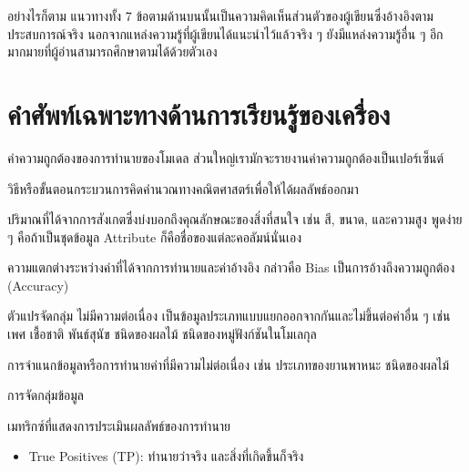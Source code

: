 อย่างไรก็ตาม แนวทางทั้ง 7 ข้อตามด้านบนนั้นเป็นความคิดเห็นส่วนตัวของผู้เขียนซึ่งอ้างอิงตามประสบการณ์จริง นอกจากแหล่งความรู้ที่ผู้เขียนได้แนะนำไว้แล้วจริง ๆ ยังมีแหล่งความรู้อื่น ๆ อีกมากมายที่ผู้อ่านสามารถศึกษาตามได้ด้วยตัวเอง

\section{คำศัพท์เฉพาะทางด้านการเรียนรู้ของเครื่อง}
\label{sec:ml_term}

\begin{description}[style=nextline]
    \item[Accuracy] ค่าความถูกต้องของการทำนายของโมเดล ส่วนใหญ่เรามักจะรายงานค่าความถูกต้องเป็นเปอร์เซ็นต์

    \item[Algorithm] วิธีหรือขั้นตอนกระบวนการคิดคำนวณทางคณิตศาสตร์เพื่อให้ได้ผลลัพธ์ออกมา

    \item[Attribute] ปริมาณที่ได้จากการสังเกตซึ่งบ่งบอกถึงคุณลักษณะของสิ่งที่สนใจ เช่น สี, ขนาด, และความสูง พูดง่าย ๆ คือถ้าเป็นชุดข้อมูล Attribute ก็คือชื่อของแต่ละคอลัมน์นั่นเอง

    \item[Bias] ความแตกต่างระหว่างค่าที่ได้จากการทำนายและค่าอ้างอิง กล่าวคือ Bias เป็นการอ้างถึงความถูกต้อง (Accuracy)

    \item[Categorical Variables] ตัวแปรจัดกลุ่ม ไม่มีความต่อเนื่อง เป็นข้อมูลประเภทแบบแยกออกจากกันและไม่ขึ้นต่อค่าอื่น ๆ เช่น เพศ เชื้อชาติ พันธ์สุนัข ชนิดของผลไม้ ชนิดของหมู่ฟังก์ชันในโมเลกุล

    \item[Classification] การจำแนกข้อมูลหรือการทำนายค่าที่มีความไม่ต่อเนื่อง เช่น ประเภทของยานพาหนะ ชนิดของผลไม้
 
    \item[Clustering] การจัดกลุ่มข้อมูล

    \item[Confusion matrix] เมทริกซ์ที่แสดงการประเมินผลลัพธ์ของการทำนาย
    \begin{itemize}[topsep=0pt,noitemsep]\setlength\itemsep{0.5em}
        \item True Positives (TP): ทำนายว่าจริง และสิ่งที่เกิดขึ้นก็จริง
        

\end{itemize}
\end{description}
